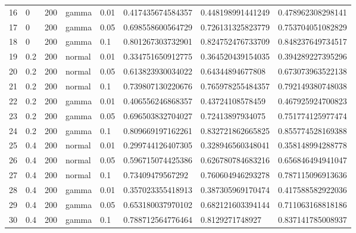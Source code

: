 \begin{table}[ht]
\begin{tabular}{rlllllll}
  16 & 0 & 200 & gamma & 0.01 & 0.417435674584357 & 0.448198991441249 & 0.478962308298141 \\ 
  17 & 0 & 200 & gamma & 0.05 & 0.698558600564729 & 0.726131325823779 & 0.753704051082829 \\ 
  18 & 0 & 200 & gamma & 0.1 & 0.801267303732901 & 0.824752476733709 & 0.848237649734517 \\ 
  19 & 0.2 & 200 & normal & 0.01 & 0.334751650912775 & 0.364520439154035 & 0.394289227395296 \\ 
  20 & 0.2 & 200 & normal & 0.05 & 0.613823930034022 & 0.64344894677808 & 0.673073963522138 \\ 
  21 & 0.2 & 200 & normal & 0.1 & 0.739807130220676 & 0.765978255484357 & 0.792149380748038 \\ 
  22 & 0.2 & 200 & gamma & 0.01 & 0.406556246868357 & 0.43724108578459 & 0.467925924700823 \\ 
  23 & 0.2 & 200 & gamma & 0.05 & 0.696503832704027 & 0.72413897934075 & 0.751774125977474 \\ 
  24 & 0.2 & 200 & gamma & 0.1 & 0.809669197162261 & 0.832721862665825 & 0.855774528169388 \\ 
  25 & 0.4 & 200 & normal & 0.01 & 0.299744126407305 & 0.328946560348041 & 0.358148994288778 \\ 
  26 & 0.4 & 200 & normal & 0.05 & 0.596715074425386 & 0.626780784683216 & 0.656846494941047 \\ 
  27 & 0.4 & 200 & normal & 0.1 & 0.73409479567292 & 0.760604946293278 & 0.787115096913636 \\ 
  28 & 0.4 & 200 & gamma & 0.01 & 0.357023355418913 & 0.387305969170474 & 0.417588582922036 \\ 
  29 & 0.4 & 200 & gamma & 0.05 & 0.653180037970102 & 0.682121603394144 & 0.711063168818186 \\ 
  30 & 0.4 & 200 & gamma & 0.1 & 0.788712564776464 & 0.8129271748927 & 0.837141785008937 \\ 
   \hline
\end{tabular}
\end{table}

